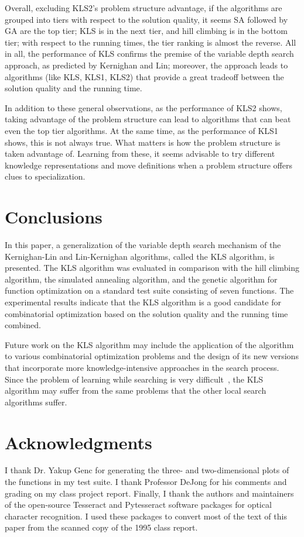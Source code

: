 \documentclass{article}
\begin{document}
Overall, excluding KLS2's problem structure advantage, if the
algorithms are grouped into tiers with respect to the solution
quality, it seems SA followed by GA are the top tier; KLS is in the
next tier, and hill climbing is in the bottom tier; with respect to
the running times, the tier ranking is almost the reverse. All in all,
the performance of KLS confirms the premise of the variable depth
search approach, as predicted by Kernighan and Lin; moreover, the
approach leads to algorithms (like KLS, KLS1, KLS2) that provide a
great tradeoff between the solution quality and the running time.

In addition to these general observations, as the performance of KLS2
shows, taking advantage of the problem structure can lead to
algorithms that can beat even the top tier algorithms. At the same
time, as the performance of KLS1 shows, this is not always true. What
matters is how the problem structure is taken advantage of. Learning
from these, it seems advisable to try different knowledge
representations and move definitions when a problem structure offers
clues to specialization.

\section{Conclusions}
\label{sec:conclusions}

In this paper, a generalization of the variable depth search mechanism
of the Kernighan-Lin and Lin-Kernighan algorithms, called the KLS
algorithm, is presented. The KLS algorithm was evaluated in comparison
with the hill climbing algorithm, the simulated annealing algorithm,
and the genetic algorithm for function optimization on a standard test
suite consisting of seven functions. The experimental results indicate
that the KLS algorithm is a good candidate for combinatorial
optimization based on the solution quality and the running time
combined.

Future work on the KLS algorithm may include the application of the
algorithm to various combinatorial optimization problems and the
design of its new versions that incorporate more knowledge-intensive
approaches in the search process. Since the problem of learning while
searching is very difficult~\cite{Ac89}, the KLS algorithm may suffer
from the same problems that the other local search algorithms suffer.

\section*{Acknowledgments}

I thank Dr. Yakup Genc for generating the three- and two-dimensional
plots of the functions in my test suite. I thank Professor DeJong for
his comments and grading on my class project report. Finally, I thank
the authors and maintainers of the open-source Tesseract and
Pytesseract software packages for optical character recognition. I
used these packages to convert most of the text of this paper from the
scanned copy of the 1995 class report.



\end{document}
